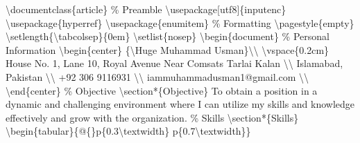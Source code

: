 \documentclass{article}%
\begin{document}
%
\normalsize%
\textbackslash{}documentclass\{article\}\newline%
\newline%
\% Preamble\newline%
\textbackslash{}usepackage{[}utf8{]}\{inputenc\}\newline%
\textbackslash{}usepackage\{hyperref\}\newline%
\textbackslash{}usepackage\{enumitem\}\newline%
\newline%
\% Formatting\newline%
\textbackslash{}pagestyle\{empty\}\newline%
\textbackslash{}setlength\{\textbackslash{}tabcolsep\}\{0em\}\newline%
\textbackslash{}setlist\{nosep\}\newline%
\newline%
\textbackslash{}begin\{document\}\newline%
\newline%
\% Personal Information\newline%
\textbackslash{}begin\{center\}\newline%
\{\textbackslash{}Huge Muhammad Usman\}\textbackslash{}\textbackslash{}\newline%
\textbackslash{}vspace\{0.2cm\}\newline%
House No. 1, Lane 10, Royal Avenue Near Comsats Tarlai Kalan \textbackslash{}\textbackslash{}\newline%
Islamabad, Pakistan \textbackslash{}\textbackslash{}\newline%
+92 306 9116931 \textbackslash{}\textbackslash{}\newline%
iammuhammadusman1@gmail.com \textbackslash{}\textbackslash{}\newline%
\textbackslash{}end\{center\}\newline%
\newline%
\% Objective\newline%
\textbackslash{}section*\{Objective\}\newline%
To obtain a position in a dynamic and challenging environment where I can utilize my skills and knowledge effectively and grow with the organization.\newline%
\newline%
\% Skills\newline%
\textbackslash{}section*\{Skills\}\newline%
\textbackslash{}begin\{tabular\}\{@\{\}p\{0.3\textbackslash{}textwidth\} p\{0.7\textbackslash{}textwidth\}\}\newline%
\end{document}
